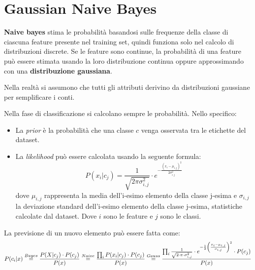 \section{Gaussian Naive Bayes}
\textbf{Naive bayes} stima le probabilità basandosi sulle frequenze della classe
di ciascuna feature presente nel training set, quindi funziona solo nel calcolo
di distribuzioni discrete. Se le feature sono continue, la probabilità di una
feature può essere stimata usando la loro distribuzione continua oppure
approssimando con una \textbf{distribuzione gaussiana}.
\begin{nota}
    Nella realtà si assumono che tutti gli attributi derivino da distribuzioni
    gaussiane per semplificare i conti.
\end{nota}
Nella fase di classificazione si calcolano sempre le probabilità. Nello specifico:
\begin{itemize}
    \item La \textit{prior} è la probabilità che una classe $c$ venga osservata
          tra le etichette del dataset.
    \item La \textit{likelihood} può essere calcolata usando la seguente formula:
          \begin{equation}
              P(x_i|c_j) = \frac{1}{\sqrt{2 \pi \sigma_{i, j}^2}} \cdot e^{-
                      \frac{(x_i - \mu_{i,j})^2}{2 \sigma_{i,j}^2}}
          \end{equation}
          dove $\mu_{i, j}$ rappresenta la media dell'i-esimo elemento della
          classe j-esima e $\sigma_{i, j}$ la deviazione standard dell'i-esimo
          elemento della classe j-esima, statistiche calcolate dal dataset.
          Dove $i$ sono le feature e $j$ sono le classi.
\end{itemize}
La previsione di un nuovo elemento può essere fatta come:
\begin{equation*}
    P(c_i | x) \stackrel{Bayes}{=} \frac{P(X | c_j) \cdot P(c_j)}{P(x)} \\
    \stackrel{Naive}{=} \frac{\prod_i P(x_i | c_j) \cdot P(c_j)}{P(x)} \\
    \stackrel{Gauss}{=} \frac{\prod_i \frac{1}{\sqrt{2\cdot \pi \cdot \sigma_{i, j}^2}}
        \cdot e^{- \frac{1}{2} \left(\frac{x_i - \mu_{i, j}}{\sigma_{i, j}}\right)^2}
        \cdot P(c_j)}{P(x)}
\end{equation*}
